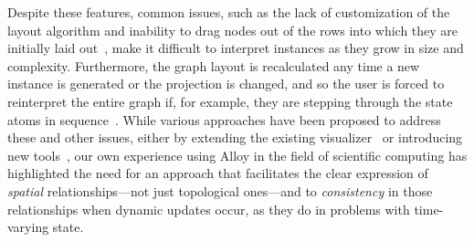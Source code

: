 \documentclass[runningheads]{llncs}
\begin{document}
Despite these features, common issues, such as the lack of customization of the layout algorithm and inability to drag nodes out of the rows into which they are initially laid out~\cite{couto2018,macedo2019}, make it difficult to interpret instances as they grow in size and complexity.
Furthermore, the graph layout is recalculated any time a new instance is generated or the projection is changed, and so the user is forced to reinterpret the entire graph if, for example, they are stepping through the state atoms in sequence~\cite{couto2018,misue1995,zaman2013}.
While various approaches have been proposed to address these and other issues, either by extending the existing visualizer~\cite{zaman2013} or introducing new tools~\cite{couto2018,macedo2019,gammaitoni2014}, our own experience using Alloy in the field of scientific computing has highlighted the need for an approach that facilitates the clear expression of \emph{spatial} relationships---not just topological ones---and to \emph{consistency} in those relationships when dynamic updates occur, as they do in problems with time-varying state.




\end{document}
